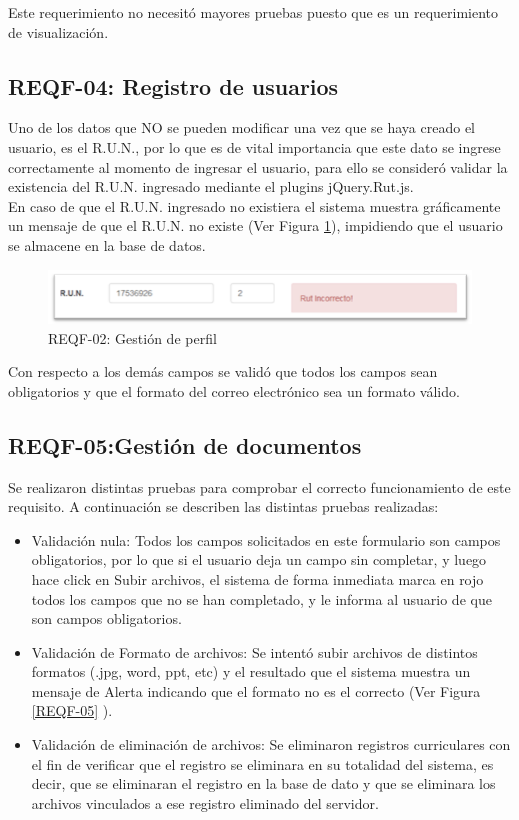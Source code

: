 Este requerimiento no necesitó mayores pruebas puesto que es un requerimiento de visualización.

\subsection{REQF-04: Registro de usuarios}

Uno de los datos que NO se pueden modificar una vez que se haya creado el usuario, es el R.U.N., por lo que es de vital importancia que este dato se ingrese correctamente al momento de ingresar el usuario, para ello se consideró validar la existencia del R.U.N. ingresado mediante el plugins jQuery.Rut.js. \\

En caso de que el R.U.N. ingresado no existiera el sistema muestra gráficamente un mensaje de que el R.U.N. no existe (Ver Figura \ref{REQF-02-rut}), impidiendo que el usuario se almacene en la base de datos.

\begin{figure}[H]
	\centering
	\includegraphics[width=1\textwidth]{images/Capitulo_5/REQF-02-rut.png}
	\caption[REQF-02: Gestión de perfil]{REQF-02: Gestión de perfil}
	\label{REQF-02-rut}
\end{figure}

Con respecto a los demás campos se validó que todos los campos sean obligatorios y que el formato del correo electrónico sea un formato  válido.


\subsection{REQF-05:Gestión de documentos}

Se realizaron distintas pruebas para comprobar el correcto funcionamiento de este requisito. A continuación se describen las distintas pruebas realizadas:
\begin{itemize}
	\item Validación nula: Todos los  campos solicitados en  este formulario son campos obligatorios, por lo que si el usuario deja un campo sin completar, y luego  hace click en Subir archivos, el sistema de forma inmediata marca en rojo todos los campos que no se han completado, y le informa al usuario de que son campos obligatorios.
	
	\item Validación de Formato de archivos: Se intentó subir archivos de distintos formatos (.jpg, word, ppt, etc) y el resultado que el sistema muestra un mensaje de Alerta indicando que el formato no es el correcto (Ver Figura \ref{REQF-05} ).
	
	\item Validación de eliminación de archivos: Se eliminaron registros curriculares con el fin de verificar que el registro se eliminara en su totalidad del sistema, es decir, que se eliminaran el registro en la base de dato y que se eliminara los archivos vinculados a ese registro eliminado del servidor.
\end{itemize}



